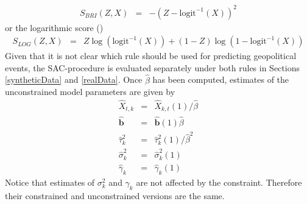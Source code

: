 \documentclass[aoas, preprint]{imsart}
\numberwithin{equation}{section}
\theoremstyle{plain}
\newcommand{\logit}{\text{logit}}
\begin{document}
\begin{eqnarray*}
S_{BRI}(Z, X) &=& -(Z - \logit^{-1}(X))^2
\end{eqnarray*}
or the logarithmic score (\citet{good1952rational})
\begin{eqnarray*}
S_{LOG}(Z, X) &=& Z \log\left(\logit^{-1}(X)\right) + (1-Z) \log\left(1-\logit^{-1}(X)\right)
\end{eqnarray*}
Given that it is not clear which rule should be used for predicting geopolitical events, the SAC-procedure is evaluated  separately under both rules in Sections \ref{syntheticData} and \ref{realData}. Once $\hat{\beta}$ has been computed, estimates of the unconstrained model parameters are given by
\begin{eqnarray}
 \hat{X}_{t,k}&=& \hat{X}_{k,t}(1) / \hat{\beta} \nonumber\\
 \hat{\boldsymbol{b}}&=& \hat{\boldsymbol{b}}(1) \hat{\beta} \nonumber\\
   \hat{\tau}_{k}^2&=& \hat{\tau}_{k}^2(1)/ \hat{\beta}^2\nonumber\\
  \hat{\sigma}_{k}^2&=& \hat{\sigma}_{k}^2(1)\nonumber\\
  \hat{\gamma}_{k}&=& \hat{\gamma}_{k}(1)\nonumber
\end{eqnarray}
Notice that estimates of $\sigma^2_k$ and $\gamma_k$ are not affected by the constraint. Therefore their constrained and unconstrained versions are the same.
\end{document}
